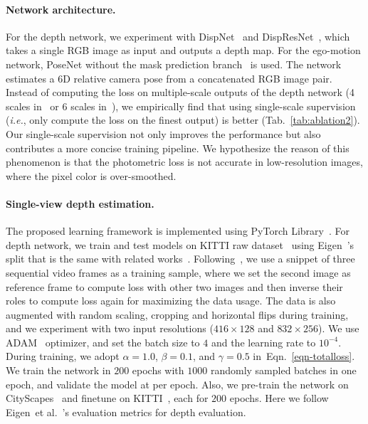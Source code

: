 \documentclass{article}
\newcommand{\tabref}[1]{Tab.~\ref{#1}}
\newcommand{\equref}[1]{Eqn.~\ref{#1}}
\def\ie{\emph{i.e.}}
\def\etal{et al.}
\begin{document}
\paragraph{Network architecture.}
For the depth network, we experiment with DispNet~\cite{zhou2017unsupervised} and DispResNet~\cite{ranjan2019cc}, which takes a single RGB image as input and outputs a depth map.
For the ego-motion network, PoseNet without the mask prediction branch~\cite{zhou2017unsupervised} is used. 
The network estimates a 6D relative camera pose from a concatenated RGB image pair.
Instead of computing the loss on multiple-scale outputs of the depth network (4 scales in~\cite{zhou2017unsupervised} or 6 scales in~\cite{ranjan2019cc}),
we empirically find that using single-scale supervision (\ie, only compute the loss on the finest output) is better (\tabref{tab:ablation2}).
Our single-scale supervision not only improves the performance but also contributes a more concise training pipeline.
We hypothesize the reason of this phenomenon is that the photometric loss is not accurate in low-resolution images, where the pixel color is over-smoothed.











\paragraph{Single-view depth estimation.}
The proposed learning framework is implemented using PyTorch Library~\cite{paszke2017automatic}.
For depth network, we train and test models on KITTI raw dataset~\cite{Geiger2013IJRR} using Eigen~\cite{eigen2014depth}’s split that is the same with related works~\cite{zou2018df,yin2018geonet,ranjan2019cc,zhou2017unsupervised}.
Following~\cite{zhou2017unsupervised}, we use a snippet of three sequential video frames as a training sample, 
where we set the second image as reference frame to compute loss with other two images and then inverse their roles to compute loss again for maximizing the data usage.
The data is also augmented with random scaling, cropping and horizontal flips during training, and we experiment with two input resolutions ($416 \times 128$ and $832 \times 256$).
We use ADAM~\cite{kingma2014adam} optimizer, and set the batch size to $4$ and the learning rate to $10^{-4}$.
During training, we adopt $\alpha = 1.0$, $\beta = 0.1$, and $\gamma = 0.5$ in~\equref{eqn-totalloss}.
We train the network in $200$ epochs with $1000$ randomly sampled batches in one epoch, and validate the model at per epoch.
Also, we pre-train the network on CityScapes~\cite{Cordts2016Cityscapes} and finetune on KITTI~\cite{Geiger2013IJRR}, each for $200$ epochs.
Here we follow Eigen~\etal~\cite{eigen2014depth}'s evaluation metrics for depth evaluation. 
\end{document}

